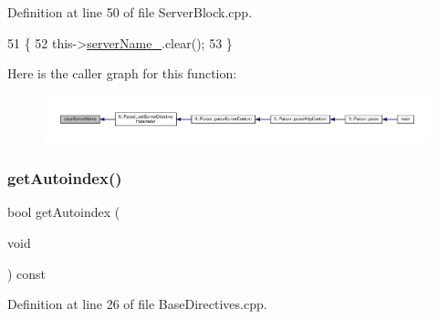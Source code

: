 Definition at line 50 of file Server\+Block.\+cpp.


\begin{DoxyCode}
51     \{
52         this->\hyperlink{classft_1_1_server_block_adc26ae834350b4c964d4198e7a431e90}{serverName\_}.clear();
53     \}
\end{DoxyCode}
Here is the caller graph for this function\+:
\nopagebreak
\begin{figure}[H]
\begin{center}
\leavevmode
\includegraphics[width=350pt]{classft_1_1_server_block_aaf4aa7d96124b157e91274eb88c77808_icgraph}
\end{center}
\end{figure}
\mbox{\label{classft_1_1_base_directives_a4c11ed7ad76aeac228b029a2444de568}} 
\subsubsection{\texorpdfstring{get\+Autoindex()}{getAutoindex()}}
{\footnotesize\ttfamily bool get\+Autoindex (\begin{DoxyParamCaption}\item[{void}]{ }\end{DoxyParamCaption}) const\hspace{0.3cm}{\ttfamily [inherited]}}



Definition at line 26 of file Base\+Directives.\+cpp.


